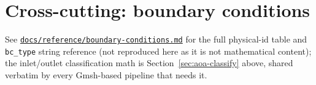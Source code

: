 \documentclass[11pt]{article}
\begin{document}
\section{Cross-cutting: boundary conditions}
\label{sec:bc-reference}
See \href{https://github.com/kvishalrai/AeroHexMesh/blob/master/docs/reference/boundary-conditions.md}{\texttt{docs/reference/boundary-conditions.md}}
for the full physical-id table and \texttt{bc\_type} string reference
(not reproduced here as it is not mathematical content); the
inlet/outlet classification math is Section~\ref{sec:aoa-classify} above,
shared verbatim by every Gmsh-based pipeline that needs it.
\end{document}
